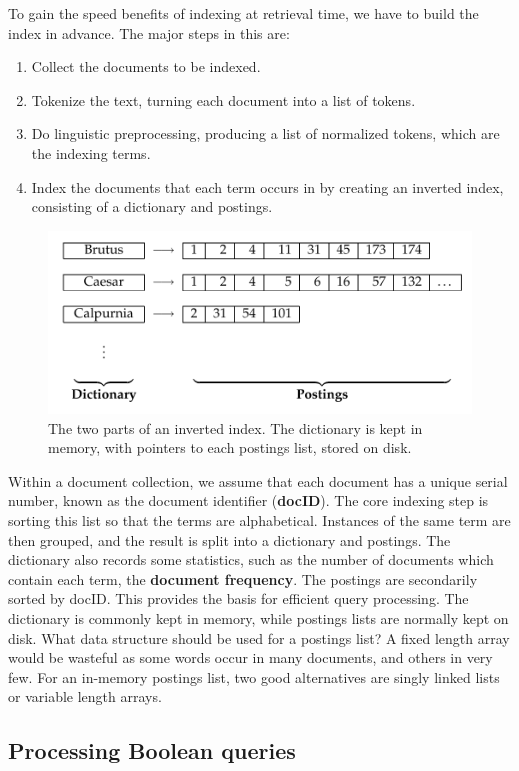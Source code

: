 \documentclass[letterpaper,11pt]{article}
\begin{document}
To gain the speed benefits of indexing at retrieval time, we have to build the index in advance. The major steps in this are:
\begin{enumerate}
    \item Collect the documents to be indexed.
    \item Tokenize the text, turning each document into a list of tokens.
    \item Do linguistic preprocessing, producing a list of normalized tokens, which are the indexing terms.
    \item Index the documents that each term occurs in by creating an inverted index, consisting of a dictionary and postings.
\end{enumerate}
\begin{figure}[H]
    \centering
    \includegraphics[scale=0.45]{sect1/figure1_3.png}
    \caption{The two parts of an inverted index. The dictionary is kept in memory, with pointers to each postings list, stored on disk.}
\end{figure}
Within a document collection, we assume that each document has a unique serial number, known as the document identifier (\textbf{docID}). The core indexing step is sorting this list so that the terms are alphabetical. Instances of the same term are then grouped, and the result is split into a dictionary and postings. The dictionary also records some statistics, such as the number of documents which contain each term, the \textbf{document frequency}. The postings are secondarily sorted by docID. This provides the basis for efficient query processing. The dictionary is commonly kept in memory, while postings lists are normally kept on disk. What data structure should be used for a postings list? A fixed length array would be wasteful as some words occur in many documents, and others in very few. For an in-memory postings list, two good alternatives are singly linked lists or variable length arrays.

\subsection{Processing Boolean queries}
\end{document}
